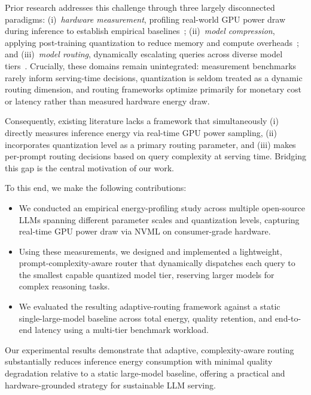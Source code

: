\documentclass[runningheads]{llncs}
\begin{document}
Prior research addresses this challenge through three largely disconnected paradigms: (i)~\emph{hardware measurement}, profiling real-world GPU power draw during inference to establish empirical baselines~\cite{samsi2023words, fernandez2025energy, wilkins2024hybrid, ji2025systematic, niu2026tokenpowerbench}; (ii)~\emph{model compression}, applying post-training quantization to reduce memory and compute overheads~\cite{frantar2022gptq, li2023thirsty, xiao2023smoothquant, dettmers2022llmint8}; and (iii)~\emph{model routing}, dynamically escalating queries across diverse model tiers~\cite{chen2023frugalgpt, ong2024routellm, ding2024hybridllm, khan2025optimizing}. Crucially, these domains remain unintegrated: measurement benchmarks rarely inform serving-time decisions, quantization is seldom treated as a dynamic routing dimension, and routing frameworks optimize primarily for monetary cost or latency rather than measured hardware energy draw.
 
Consequently, existing literature lacks a framework that simultaneously (i) directly measures inference energy via real-time GPU power sampling, (ii) incorporates quantization level as a primary routing parameter, and (iii) makes per-prompt routing decisions based on query complexity at serving time. Bridging this gap is the central motivation of our work.
 
To this end, we make the following contributions:
 
\begin{itemize}
    \item We conducted an empirical energy-profiling study across multiple open-source LLMs spanning different parameter scales and quantization levels, capturing real-time GPU power draw via NVML on consumer-grade hardware.
    \item Using these measurements, we designed and implemented a lightweight, prompt-complexity-aware router that dynamically dispatches each query to the smallest capable quantized model tier, reserving larger models for complex reasoning tasks.
    \item We evaluated the resulting adaptive-routing framework against a static single-large-model baseline across total energy, quality retention, and end-to-end latency using a multi-tier benchmark workload.
\end{itemize}
 
Our experimental results demonstrate that adaptive, complexity-aware routing substantially reduces inference energy consumption with minimal quality degradation relative to a static large-model baseline, offering a practical and hardware-grounded strategy for sustainable LLM serving.
\end{document}
